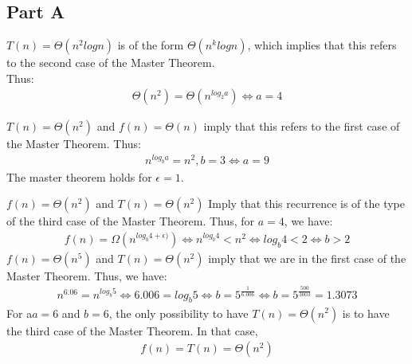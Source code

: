 \documentclass[12pt,twoside]{article}
\begin{document}

\begin{problems}

\section*{Part A}

\problem  %

\begin{problemparts}
\problempart 

$T(n)=\Theta(n^2logn)$
 is of the form $\Theta(n^klogn)$, which implies that this refers to the second case of the Master Theorem. \\ Thus:
\begin{align*}
\Theta(n^2)=\Theta(n^{log_2a})\Longleftrightarrow a=4 
\end{align*} 

\problempart 

$T(n)=\Theta(n^2)$ and $f(n)=\Theta(n)$ imply that this refers to the first case of the Master Theorem. Thus:
\begin{align*}
n^{log_ba}=n^2, b=3 \Longleftrightarrow a=9
\end{align*}
The master theorem holds for $\epsilon = 1$.

\problempart 
$f(n)=\Theta(n^2)$ and $T(n)=\Theta(n^2)$ Imply that this recurrence is of the type of the third case of the Master Theorem. Thus, for $a=4$, we have:
\begin{align*}
f(n)=\Omega(n^{log_b4+\epsilon)}) \Longleftrightarrow n^{log_b4}<n^2 \Longleftrightarrow log_b4<2 \Longleftrightarrow b>2
\end{align*}
\problempart 
$f(n)=\Theta(n^5)$ and $T(n) = \Theta(n^2)$ imply that we are in the first case of the Master Theorem. 
Thus, we have: 
\begin{align*}
n^6.06 = n^{log_b5} \Longleftrightarrow 6.006 = log_b5 \Longleftrightarrow b=5^{\frac{1}{6.006}} \Longleftrightarrow b = 5^{\frac{500}{3003}} = 1.3073
\end{align*}
\problempart 
For a$a=6$ and $b=6$, the only possibility to have $T(n)=\Theta(n^2)$ is to have the third case of the Master Theorem. In that case,
\begin{align*}
f(n)=T(n)=\Theta(n^2)
\end{align*}
\end{problemparts}


\end{problems}
\end{document}
